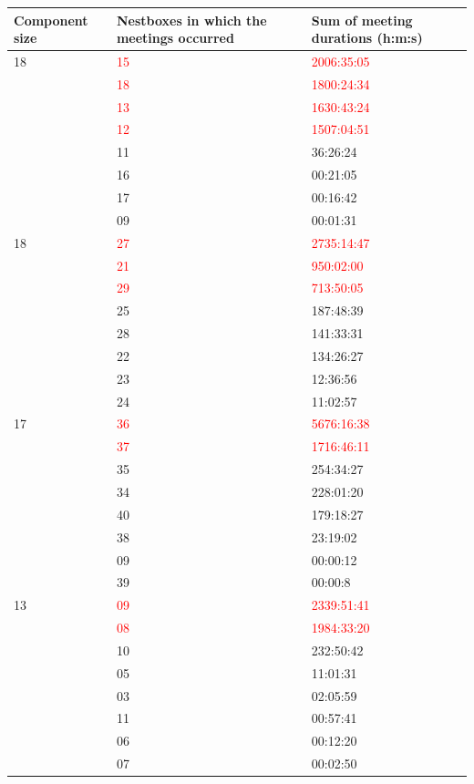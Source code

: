 \begin{table}
\begin{center}
\small
\renewcommand\arraystretch{1.1}
\begin{tabular}{lll}
\hline
\textbf{Component size} &	\textbf{Nestboxes in which the meetings occurred}	&	\textbf{Sum of meeting durations (h:m:s)} \\\hline
18	& \textcolor{red}{15}	& \textcolor{red}{2006:35:05} \\
 	& \textcolor{red}{18}	& \textcolor{red}{1800:24:34} \\
	& \textcolor{red}{13}	& \textcolor{red}{1630:43:24} \\
	& \textcolor{red}{12}	& \textcolor{red}{1507:04:51} \\
	& 11	& 36:26:24 \\
	& 16	& 00:21:05 \\
	& 17	& 00:16:42 \\
	& 09	& 00:01:31 \\\hline

18	& \textcolor{red}{27}	& \textcolor{red}{2735:14:47} \\
	& \textcolor{red}{21}	& \textcolor{red}{950:02:00} \\
	& \textcolor{red}{29}	& \textcolor{red}{713:50:05} \\
	& 25	& 187:48:39 \\
	& 28	& 141:33:31 \\
	& 22	& 134:26:27 \\
	& 23 	& 12:36:56 \\
	& 24	& 11:02:57 \\\hline

17	& \textcolor{red}{36}	& \textcolor{red}{5676:16:38} \\
	& \textcolor{red}{37}	& \textcolor{red}{1716:46:11} \\
	& 35	& 254:34:27 \\
	& 34	& 228:01:20 \\
	& 40	& 179:18:27 \\
	& 38	& 23:19:02 \\
	& 09	& 00:00:12 \\
	& 39	& 00:00:8 \\\hline

13	& \textcolor{red}{09}	& \textcolor{red}{2339:51:41} \\
	& \textcolor{red}{08} 	& \textcolor{red}{1984:33:20} \\
	& 10	& 232:50:42 \\
	& 05	& 11:01:31 \\
	& 03 	& 02:05:59 \\
	& 11 	& 00:57:41 \\
	& 06	& 00:12:20 \\
	& 07	& 00:02:50 \\\hline
	

\end{tabular}
\end{center}
\end{table}
